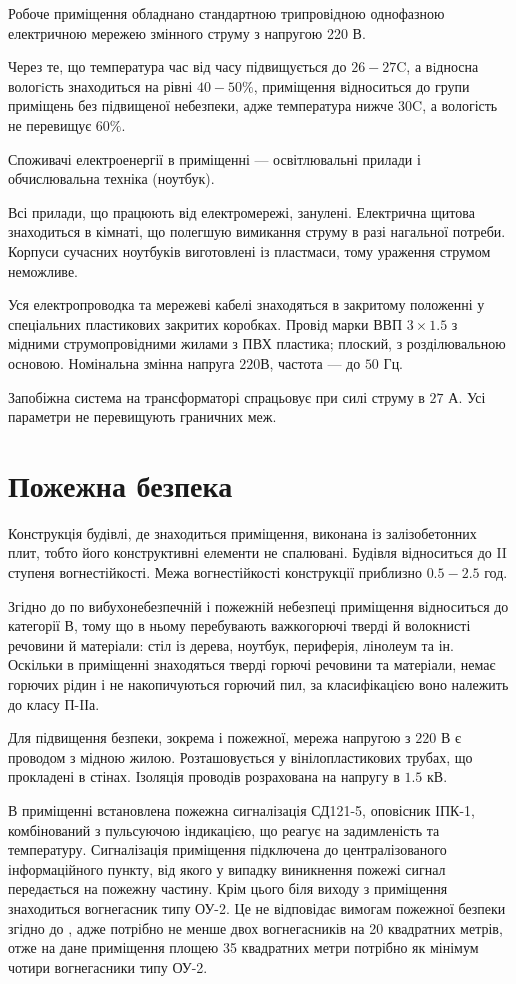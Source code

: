 Робоче приміщення обладнано стандартною трипровідною однофазною електричною
мережею змінного струму з напругою 220 В.

Через те, що температура час від часу підвищується до $26-27$C,
а вiдносна вологiсть знаходиться на рівні $40-50\%$,
приміщення відноситься до групи приміщень без підвищеної небезпеки,
адже температура нижче $30$C, а вологість не перевищує $60\%$.

Споживачі електроенергії в приміщенні --- освітлювальні прилади
і обчислювальна техніка (ноутбук).

Всі прилади, що працюють від електромережі, занулені.
Електрична щитова знаходиться в кімнаті,
що полегшую вимикання струму в разі нагальної потреби.
Корпуси сучасних ноутбуків виготовлені із пластмаси,
тому ураження струмом неможливе.

Уся електропроводка та мережеві кабелі знаходяться в закритому положенні
у спеціальних пластикових закритих коробках.
Провід марки ВВП $3\times 1.5$ з мідними струмопровідними жилами з ПВХ пластика;
плоский, з розділювальною основою.
Номінальна змінна напруга $220$В, частота --- до $50$ Гц.

Запобіжна система на трансформаторі спрацьовує при силі струму в $27$ А.
Усі параметри не перевищують граничних меж.

\section{Пожежна безпека}

Конструкція будівлі, де знаходиться приміщення, виконана із залізобетонних плит,
тобто його конструктивні елементи не спалювані.
Будівля відноситься до II ступеня вогнестійкості.
Межа вогнестійкості конструкції приблизно $0.5 - 2.5$ год.

Згідно до \cite{ONTP} по вибухонебезпечній і пожежній небезпеці приміщення
відноситься до категорії В, тому що в ньому перебувають важкогорючі тверді
й волокнисті речовини й матеріали: стіл із дерева, ноутбук, периферія, лінолеум
та ін.
Оскільки в приміщенні знаходяться тверді горючі речовини та матеріали,
немає горючих рідин і не накопичуються горючий пил,
за класифікацією воно належить до класу П-IІа.

Для підвищення безпеки, зокрема і пожежної, мережа напругою з $220$ В
є проводом з мідною жилою.
Розташовується у вінілопластикових трубах, що прокладені в стінах.
Ізоляція проводів розрахована на напругу в $1.5$ кВ. 

В приміщенні встановлена пожежна сигналізація СД121-5, оповісник ІПК-1,
комбінований з пульсуючою індикацією, що реагує на задимленість та температуру.
Сигналізація приміщення підключена до централізованого інформаційного пункту,
від якого у випадку виникнення пожежі сигнал передається на пожежну частину.
Крім цього біля виходу з приміщення знаходиться вогнегасник типу ОУ-2.
Це не відповідає вимогам пожежної безпеки згідно до \cite{PPBU},
адже потрібно не менше двох вогнегасників на 20 квадратних метрів,
отже на дане приміщення площею 35 квадратних метри потрібно як мінімум
чотири вогнегасники типу ОУ-2.

